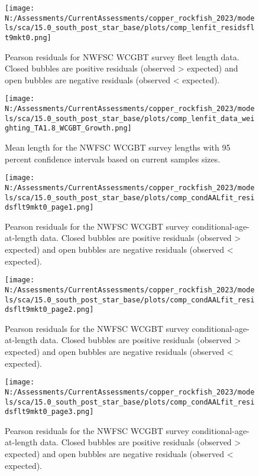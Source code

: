 \documentclass[11pt,
  english,
  letterpaper,
]{article}
\begin{document}
\begin{figure}
\centering
\texttt{[image: N:/Assessments/CurrentAssessments/copper\_rockfish\_2023/models/sca/15.0\_south\_post\_star\_base/plots/comp\_lenfit\_residsflt9mkt0.png]}
\caption{Pearson residuals for NWFSC WCGBT survey fleet length data. Closed bubbles are positive residuals (observed \textgreater{} expected) and open bubbles are negative residuals (observed \textless{} expected).\label{fig:wcgbt-len-pearson}}
\end{figure}

\pagebreak

\begin{figure}
\centering
\texttt{[image: N:/Assessments/CurrentAssessments/copper\_rockfish\_2023/models/sca/15.0\_south\_post\_star\_base/plots/comp\_lenfit\_data\_weighting\_TA1.8\_WCGBT\_Growth.png]}
\caption{Mean length for the NWFSC WCGBT survey lengths with 95 percent confidence intervals based on current samples sizes.\label{fig:wcgbt-mean-len-fit}}
\end{figure}

\pagebreak

\begin{figure}
\centering
\texttt{[image: N:/Assessments/CurrentAssessments/copper\_rockfish\_2023/models/sca/15.0\_south\_post\_star\_base/plots/comp\_condAALfit\_residsflt9mkt0\_page1.png]}
\caption{Pearson residuals for the NWFSC WCGBT survey conditional-age-at-length data. Closed bubbles are positive residuals (observed \textgreater{} expected) and open bubbles are negative residuals (observed \textless{} expected).\label{fig:wcgbt-age-pearson-1}}
\end{figure}

\pagebreak

\begin{figure}
\centering
\texttt{[image: N:/Assessments/CurrentAssessments/copper\_rockfish\_2023/models/sca/15.0\_south\_post\_star\_base/plots/comp\_condAALfit\_residsflt9mkt0\_page2.png]}
\caption{Pearson residuals for the NWFSC WCGBT survey conditional-age-at-length data. Closed bubbles are positive residuals (observed \textgreater{} expected) and open bubbles are negative residuals (observed \textless{} expected).\label{fig:wcgbt-age-pearson-2}}
\end{figure}

\pagebreak

\begin{figure}
\centering
\texttt{[image: N:/Assessments/CurrentAssessments/copper\_rockfish\_2023/models/sca/15.0\_south\_post\_star\_base/plots/comp\_condAALfit\_residsflt9mkt0\_page3.png]}
\caption{Pearson residuals for the NWFSC WCGBT survey conditional-age-at-length data. Closed bubbles are positive residuals (observed \textgreater{} expected) and open bubbles are negative residuals (observed \textless{} expected).\label{fig:wcgbt-age-pearson-3}}
\end{figure}
\end{document}
